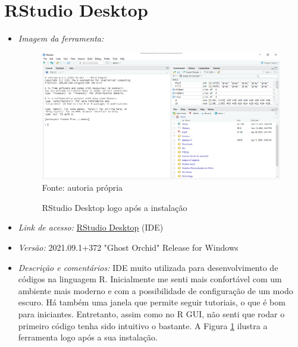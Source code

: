   \section{RStudio Desktop}
    \begin{itemize}
    	
    	\item \textit{Imagem da ferramenta:}
    	
    	\begin{figure}[H]  \label{RStudio_Desktop}
    		\centering
    		\caption{RStudio Desktop logo após a instalação}
    		\includegraphics[width=16cm]{PicturesJoaoDias/Ferramentas/RStudio Desktop/RStudio_tela_inicial.png}
    		{\tiny \sf Fonte: autoria própria}
    	\end{figure}
    	
        \item  \textit{Link de acesso:} \href{https://www.rstudio.com/products/rstudio/download/#download}{RStudio Desktop}  (IDE)
        \item \textit{Versão:} 2021.09.1+372 "Ghost Orchid" Release for Windows
        \item \textit{Descrição e comentários:}
          IDE muito utilizada para desenvolvimento de códigos na linguagem R. Inicialmente me senti mais confortável com um ambiente mais moderno e com a possibilidade de configuração de um modo escuro. Há também uma janela que permite seguir tutoriais, o que é bom para iniciantes. Entretanto, assim como no R GUI, não senti que rodar o primeiro código tenha sido intuitivo o bastante. A Figura \ref{RStudio_Desktop} ilustra a ferramenta logo após a sua instalação.
    \end{itemize}
	\newpage
